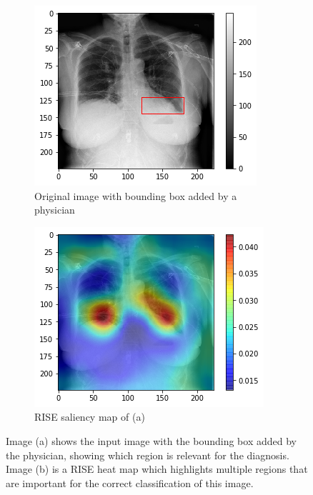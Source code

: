 \begin{figure}[H]
    \centering
    \begin{subfigure}[t]{.45\textwidth}
        \centering
        \includegraphics[width=\linewidth]{chapters/03_classification/images/rise1_bbox.png}
        \caption{Original image with bounding box added by a physician}
    \end{subfigure}\hspace{1cm}%
    \begin{subfigure}[t]{.45\textwidth}
        \centering
        \includegraphics[width=\linewidth]{chapters/03_classification/images/rise1_saliency.png}
        \caption{RISE saliency map of (a)}
    \end{subfigure}
    \caption{Image (a) shows the input image with the bounding box added by the physician, showing which region is relevant for the diagnosis. Image (b) is a RISE heat map which highlights multiple regions that are important for the correct classification of this image.}
    \label{rise_example_2}
\end{figure}


